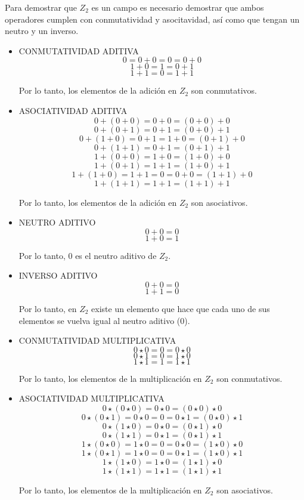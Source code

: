 \documentclass{article}
\begin{document}
Para demostrar que $Z_2$ es un campo es necesario demostrar que ambos operadores cumplen con conmutatividad y asocitavidad, así como que tengan un neutro y un inverso.

\begin{itemize}
    \item CONMUTATIVIDAD ADITIVA
$$
0 = 0 + 0 = 0 = 0 + 0
$$$$
1 + 0 = 1 = 0 + 1
$$$$
1 + 1 = 0 = 1 + 1
$$

Por lo tanto, los elementos de la adición en $Z_2$ son conmutativos.

    \item ASOCIATIVIDAD ADITIVA
$$
0+(0+0) = 0+0 = (0+0) + 0
$$$$
0+(0+1) = 0+1 = (0+0) + 1
$$$$
0+(1+0) = 0+1 = 1+0 = (0+1) + 0
$$$$
0+(1+1) = 0+1 = (0+1) + 1
$$$$
1+(0+0) = 1+0 = (1+0) + 0
$$$$
1+(0+1) = 1+1 = (1+0) + 1
$$$$
1+(1+0) = 1+1 = 0 = 0 + 0 = (1+1) + 0
$$$$
1+(1+1) = 1+1 = (1+1) + 1
$$

Por lo tanto, los elementos de la adición en $Z_2$ son asociativos.

    \item NEUTRO ADITIVO
$$
0+0 = 0
$$$$
1+0 = 1
$$

Por lo tanto, $0$ es el neutro aditivo de $Z_2$.

    \item INVERSO ADITIVO
$$
0 + 0 = 0
$$$$
1 + 1 = 0
$$

Por lo tanto, en $Z_2$ existe un elemento que hace que cada uno de sus elementos se vuelva igual al neutro aditivo ($0$).
    \item CONMUTATIVIDAD MULTIPLICATIVA
$$
0 \star 0 = 0 = 0 \star 0
$$$$
0 \star 1 = 0 = 1 \star 0
$$$$
1 \star 1 = 1 = 1 \star 1
$$

Por lo tanto, los elementos de la multiplicación en $Z_2$ son conmutativos.

    \item ASOCIATIVIDAD MULTIPLICATIVA
$$
0 \star (0 \star 0) = 0 \star 0 = (0 \star 0) \star 0
$$$$
0 \star (0 \star 1) = 0 \star 0 = 0 = 0 \star 1 = (0 \star 0) \star 1
$$$$
0 \star (1 \star 0) = 0 \star 0 = (0 \star 1) \star 0
$$$$
0 \star (1 \star 1) = 0 \star 1 = (0 \star 1) \star 1
$$$$
1 \star (0 \star 0) = 1 \star 0 = 0 = 0 \star 0 = (1 \star 0) \star 0
$$$$
1 \star (0 \star 1) = 1 \star 0 = 0 = 0 \star 1 = (1 \star 0) \star 1
$$$$
1 \star (1 \star 0) = 1 \star 0 = (1 \star 1) \star 0
$$$$
1 \star (1 \star 1) = 1 \star 1 = (1 \star 1) \star 1
$$

Por lo tanto, los elementos de la multiplicación en $Z_2$ son asociativos.


\end{itemize}
\end{document}

